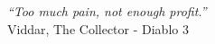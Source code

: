 
\chapter*{}
\vspace{15cm}
\begin{flushright}
	\textit
	{
		``Too much pain, not enough profit.''
	}\medskip\\ 
	Viddar, The Collector - Diablo 3
\end{flushright}